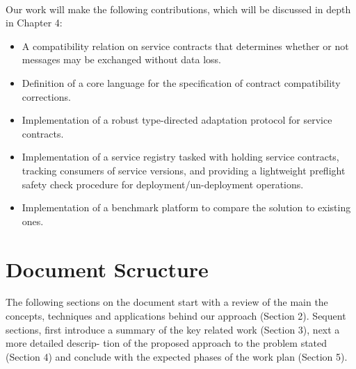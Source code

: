 \paragraph{}

Our work will make the following contributions, which will be discussed in depth in Chapter 4:

\begin{itemize}
    \item A compatibility relation on service contracts that determines whether or not messages may be exchanged without data loss.
    \item Definition of a core language for the specification of contract compatibility corrections.
    \item Implementation of a robust type-directed adaptation protocol for service contracts.
    \item Implementation of a service registry tasked with holding service contracts, tracking consumers of service versions,
    and providing a lightweight preflight safety check procedure for deployment/un-deployment operations.
    \item Implementation of a benchmark platform to compare the solution to existing ones.
\end{itemize}

\section{Document Scructure} %
\label{sec:document_structure}

The following sections on the document start with a review of the main the concepts,
techniques and applications behind our approach (Section 2).
Sequent sections, first introduce a summary of the key related work (Section 3), next a more detailed descrip-
tion of the proposed approach to the problem stated (Section 4) and conclude with the
expected phases of the work plan (Section 5).